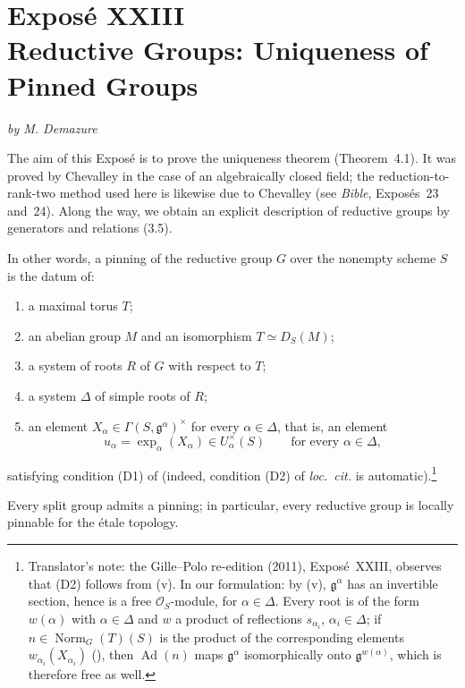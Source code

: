 \chapter*{Exposé XXIII\\Reductive Groups: Uniqueness of Pinned Groups}
\begin{center}
\textit{by M. Demazure}
\end{center}

The aim of this Exposé is to prove the uniqueness theorem
(Theorem~4.1). It was proved by Chevalley in the case of an
algebraically closed field; the reduction-to-rank-two method used here
is likewise due to Chevalley (see \textit{Bible}, Exposés~23 and~24).
Along the way, we obtain an explicit description of reductive groups
by generators and relations (3.5).



In other words, a pinning of the reductive group \(G\) over the
nonempty scheme \(S\) is the datum of:
\begin{enumerate}
  \item[(i)] a maximal torus \(T\);
  \item[(ii)] an abelian group \(M\) and an isomorphism
    \(T\simeq D_S(M)\);
  \item[(iii)] a system of roots \(R\) of \(G\) with respect to \(T\);
  \item[(iv)] a system \(\Delta\) of simple roots of \(R\);
  \item[\SGAInlineRefTarget{sga3:XXIII:1.1:item:v}(v)] an element
    \(X_\alpha\in\Gamma(S,\mathfrak g^\alpha)^\times\) for every
    \(\alpha\in\Delta\), that is, an element
    \[
      u_\alpha=\exp_\alpha(X_\alpha)\in U_\alpha^\times(S)
      \qquad\text{for every }\alpha\in\Delta,
    \]
\end{enumerate}
satisfying condition (D1) of  (indeed, condition
(D2) of \textit{loc.\ cit.} is automatic).\footnote{Translator's note: the Gille--Polo re-edition (2011), Exposé~XXIII, observes that
(D2) follows from (v). In our formulation: by (v), \(\mathfrak g^\alpha\) has an
invertible section, hence is a free \(\mathcal O_S\)-module, for \(\alpha\in\Delta\).
Every root is of the form \(w(\alpha)\) with \(\alpha\in\Delta\) and \(w\) a product of
reflections \(s_{\alpha_i}\), \(\alpha_i\in\Delta\); if \(n\in\operatorname{Norm}_G(T)(S)\)
is the product of the corresponding elements \(w_{\alpha_i}(X_{\alpha_i})\)
(), then \(\operatorname{Ad}(n)\) maps
\(\mathfrak g^\alpha\) isomorphically onto \(\mathfrak g^{w(\alpha)}\), which is
therefore free as well.}

Every split group admits a pinning; in particular, every reductive
group is locally pinnable for the étale topology.
